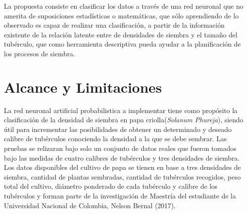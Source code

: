 La propuesta consiste en clasificar los datos a través de una red neuronal que no amerita de suposiciones estadísticas o matemáticas, que sólo aprendiendo de lo observado es capaz de realizar una clasificación, a partir de la información existente de la relaci\'on latente entre de densidades de siembra y el tamaño del tubérculo, que como herramienta descriptiva pueda ayudar a la planificaci\'on de los procesos de siembra.\\



\section{Alcance y Limitaciones}

La red neuronal artificial probabilistica a implementar tiene como propósito la clasificación de la densidad de siembra en papa criolla(\textit{Solanum Phureja}), siendo útil para incrementar las posibilidades de obtener un determinado y deseado calibre de tubérculos conociendo la densidad a la que se debe sembrar.  Las pruebas se relizaran bajo solo un conjunto de datos reales que fueron tomados bajo las medidas de cuatro calibres de tubérculos y tres densidades de siembra.\\

Los datos disponibles del cultivo de papa se tienen en base a tres densidades de siembra, cantidad de plantas sembradas, cantidad de tubérculos recogidos, peso total del cultivo, diámetro ponderado de cada tubérculo y calibre de los tubérculos y forman parte de la investigación de Maestría del estudiante de la Universidad Nacional de Colombia, Nelson Bernal (2017).\\
\\

